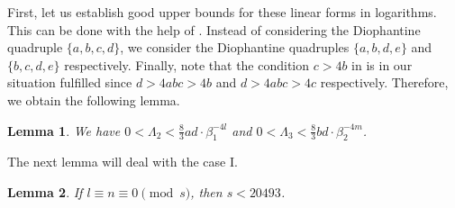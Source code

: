 \documentclass{amsart}
\newtheorem{lemma}{Lemma}
\theoremstyle{definition}
\begin{document}
First, let us establish good upper bounds for these linear forms in logarithms. This can be done
with the help of \cite[Lemma 5]{Dujella:2001}. Instead of considering the Diophantine quadruple $\{a,b,c,d\}$,
we consider the Diophantine quadruples $\{a,b,d,e\}$ and $\{b,c,d,e\}$ respectively. Finally, note that the condition
$c>4b$ in \cite[Lemma 5]{Dujella:2001} is in our situation fulfilled since $d>4abc>4b$ and $d>4abc>4c$ respectively. Therefore, we
obtain the following lemma.

\begin{lemma}\label{lem:uppbd}
We have
$0<\Lambda_2<\frac{8}{3}ad\cdot \beta_1^{-4l}$ and $0<\Lambda_3<\frac{8}{3}bd\cdot \beta_2^{-4m}$. 
\end{lemma}

The next lemma will deal with the case I. 

\begin{lemma}\label{lem:euler1}
If $l\equiv n\equiv 0 \pmod{s}$, then $s<20493$. 
\end{lemma}
\end{document}
